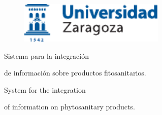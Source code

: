 \documentclass[a4paper,12pt,twoside,hidelinks,openright,openany]{report}
\begin{document}

\begin{titlepage}

\vspace*{-4mm}
\begin{figure}[!h]
  \centering
	\includegraphics[width=69.62mm]{Imagenes/UnizarLogo}
\end{figure}

\vspace*{17mm}

\fontsize{28pt}{28pt}\selectfont
\begin{center}
\setlength{\fboxsep}{3.4mm}
\end{center}

\vspace*{18.7mm}


\fontsize{22pt}{22pt}\selectfont
\begin{center}
Sistema para la integración  
\end{center}
\baselineskip 20pt
\begin{center}
de información sobre productos fitosanitarios.
\end{center}

\begin{center}
System for the integration  
\end{center}
\baselineskip 20pt
\begin{center}
of information on phytosanitary products.
\end{center}

\vspace*{0cm} 
\baselineskip 36pt
\begin{center}
\fontsize{12pt}{12pt}\selectfont
{}

\vspace*{3.65mm} 
\fontsize{18pt}{18pt}\selectfont
{}
\vspace*{1cm}
\baselineskip 36pt
\fontsize{12pt}{12pt}\selectfont
{}
\vspace*{3.56mm}
\fontsize{14pt}{14pt}\selectfont
{}
\end{center}


\end{titlepage}
\end{document}
